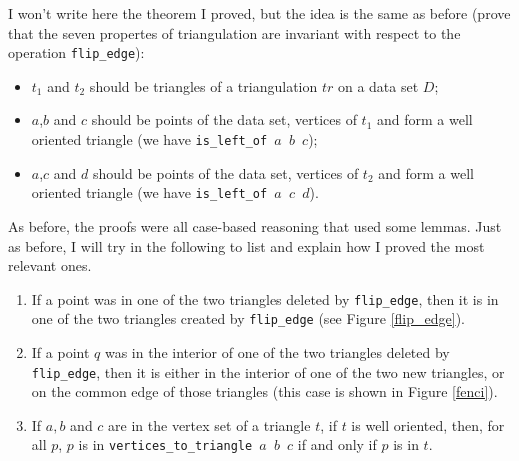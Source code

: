 \documentclass[a4paper,10pt]{article}
\begin{document}
I won't write here the theorem I proved, but the idea is the same as before (prove that the seven propertes of triangulation are invariant with respect to the operation {\tt flip\_edge}):
\begin{itemize}
\item $t_1$ and $t_2$ should be triangles of a triangulation $tr$ on a data set $D$;
\item $a$,$b$ and $c$ should be points of the data set, vertices of $t_1$ and form a well oriented triangle (we have {\tt is\_left\_of $a$ $b$ $c$});
\item $a$,$c$ and $d$ should be points of the data set, vertices of $t_2$ and form a well oriented triangle (we have {\tt is\_left\_of $a$ $c$ $d$}).
\end{itemize}

As before, the proofs were all case-based reasoning that used some lemmas. Just as before, I will try in the following to list and explain how I proved the most relevant ones.
\begin{enumerate}
\item If a point was in one of the two triangles deleted by {\tt flip\_edge}, then it is in one of the two triangles created by {\tt flip\_edge} (see Figure \ref{flip_edge}).
\item If a point $q$ was in the interior of one of the two triangles deleted by {\tt flip\_edge}, then it is either in the interior of one of the two new triangles, or on the common edge of those triangles (this case is shown in Figure \ref{fenci}).
\item If $a,b$ and $c$ are in the vertex set of a triangle $t$, if $t$ is well oriented, then, for all $p$, $p$ is in {\tt vertices\_to\_triangle $a$ $b$ $c$} if and only if $p$ is in $t$.
\end{enumerate}
\end{document}
